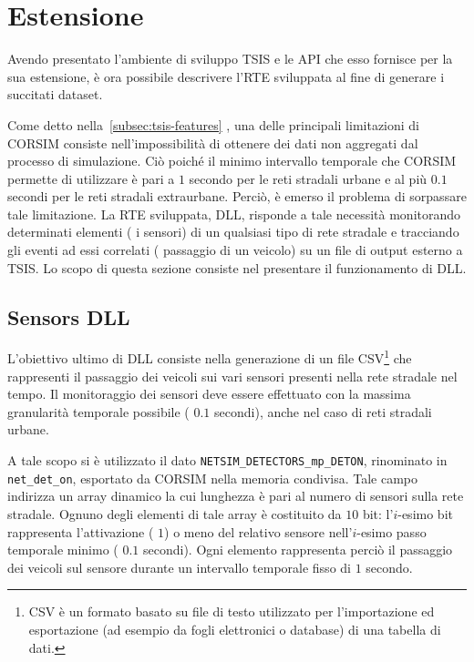 \cleardoublepage
\section{Estensione}\label{sec:sensors-rte}
Avendo presentato l'ambiente di sviluppo \acs{TSIS} e le \acs{API} che esso fornisce per la sua estensione, è ora possibile descrivere l'\acl{RTE} sviluppata al fine di generare i succitati dataset.

Come detto nella~\autoref{subsec:tsis-features} , una delle principali limitazioni di \acs{CORSIM} consiste nell'impossibilità di ottenere dei dati non aggregati dal processo di simulazione. Ciò poiché il minimo intervallo temporale che \acs{CORSIM} permette di utilizzare è pari a $1$ secondo per le reti stradali urbane e al più $0.1$ secondi per le reti stradali extraurbane. Perciò, è emerso il problema di sorpassare tale limitazione. La \acs{RTE} sviluppata,  \acs{DLL}, risponde a tale necessità monitorando determinati elementi (\ie{} i sensori) di un qualsiasi tipo di rete stradale e tracciando gli eventi ad essi correlati (\ie{} passaggio di un veicolo) su un file di output esterno a \acs{TSIS}. Lo scopo di questa sezione consiste nel presentare il funzionamento di  \acs{DLL}.

\subsection{Sensors DLL}
L'obiettivo ultimo di  \acs{DLL} consiste nella generazione di un file \acs{CSV}\footnote{\acf{CSV} è un formato basato su file di testo utilizzato per l'importazione ed esportazione (ad esempio da fogli elettronici o database) di una tabella di dati.} che rappresenti il passaggio dei veicoli sui vari sensori presenti nella rete stradale nel tempo. Il monitoraggio dei sensori deve essere effettuato con la massima granularità temporale possibile (\ie{} $0.1$ secondi), anche nel caso di reti stradali urbane.

A tale scopo si è utilizzato il dato \lstinline[]|NETSIM_DETECTORS_mp_DETON|, rinominato in \lstinline[]|net_det_on|, esportato da \acs{CORSIM} nella memoria condivisa. Tale campo indirizza un array dinamico la cui lunghezza è pari al numero di sensori sulla rete stradale. Ognuno degli elementi di tale array è costituito da $10$ bit: l'$i$-esimo bit rappresenta l'attivazione (\ie{} $1$) o meno del relativo sensore nell'$i$-esimo passo temporale minimo (\ie{} $0.1$ secondi). Ogni elemento rappresenta perciò il passaggio dei veicoli sul sensore durante un intervallo temporale fisso di $1$ secondo.

